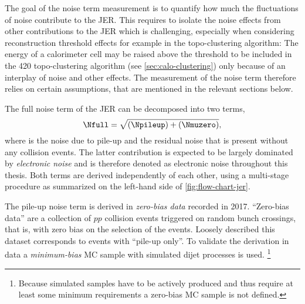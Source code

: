 The goal of the noise term measurement is to quantify how much the fluctuations of noise contribute to the JER.
This requires to isolate the noise effects from other contributions to the JER which is challenging, especially when considering reconstruction threshold effects for example in the topo-clustering algorithm:
The energy of a calorimeter cell may be raised above the threshold to be included in the 420 topo-clustering algorithm (see \cref{sec:calo-clustering}) only because of an interplay of noise and other effects. The measurement of the noise term therefore relies on certain assumptions, that are mentioned in the relevant sections below.

The full noise term of the JER can be decomposed into two terms,
\begin{equation}
    \Nfull = \sqrt{ \left(\Npileup \right) +  \left( \Nmuzero \right) },
\end{equation}
where \Npileup is the noise due to pile-up and \Nmuzero the residual noise that is present without any collision events.
The latter contribution is expected to be largely dominated by \emph{electronic noise} and is therefore denoted as electronic noise throughout this thesis.
Both terms are derived independently of each other,  using a multi-stage procedure as summarized on the left-hand side of \cref{fig:flow-chart-jer}.

The pile-up noise term is derived in \emph{zero-bias data} recorded in 2017. ``Zero-bias data'' are a collection of $pp$ collision events triggered on random bunch crossings, that is, with zero bias on the selection of the events. Loosely described this dataset corresponds to events with ``pile-up only''. To validate the derivation in data a \emph{minimum-bias} MC sample with simulated dijet processes is used.
\footnote{Because simulated samples have to be actively produced and thus require at least some minimum requirements a zero-bias MC sample is not defined.}

